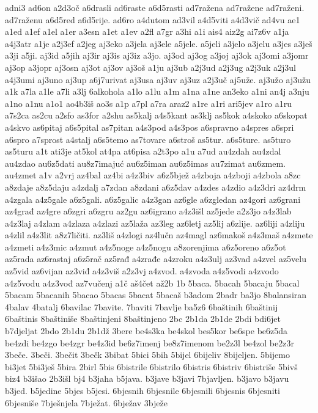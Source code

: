 {adni3
ad6on
a2d3oč
a6drasli
ad6raste
a6d5rasti
ad7ražena
ad7ražene
ad7raženi.
ad7raženu
a6d5red
a6d5rije.
ad6ro
a4dutom
ad3vil
a4d5viti
a4d3vič
ad4vu
ae1
a1ed
a1ef
a1el
a1er
a3esn
a1et
a1ev
a2fl
a7gr
a3hi
a1i
ais4
aiz2g
ai7z6v
a1ja
a4j3atr
a1je
a2j3ef
a2jeg
aj3eko
a3jela
aj3ele
a5jele.
a5jeli
a3jelo
a3jelu
a3jes
a3ješ
a3ji
a5ji.
aj3id
a5jih
aj3ir
aj3is
aj3iz
a3jo.
aj3od
aj3og
a3joj
aj3ok
aj3omi
a3jomr
aj3op
a3jopr
aj3osn
aj3ot
aj3ov
aj3oš
a1ju
aj3ub
a2j3ud
a2j3ug
a2j3uk
a2j3ul
a4j3umi
aj3uno
aj3up
a6j7urivat
aj3usa
aj3uv
aj3uz
a2j3uč
aj5uže.
aj3užo
aj3užu
a1k
a7la
a1le
a7li
a3lj
6alkohola
a1lo
a1lu
a1m
a1na
a1ne
an3eko
a1ni
an4j
a3nju
a1no
a1nu
a1o1
ao4b3iš
ao3s
a1p
a7pl
a7ra
araz2
a1re
a1ri
ari5jev
a1ro
a1ru
a7s2ca
as2cu
a2sfo
as3for
a2shu
as5kalj
a4s5kant
as3klj
as5kok
a4skoko
a6skopat
a4skvo
as6pitaj
a6s5pital
as7pitan
a4s3pod
a4s3pos
a6spravno
a4spres
a6spri
a6spro
a7sprost
a4stalj
a6s5temo
as7tovare
a6stroš
as5tur.
a6s5ture.
as5turo
as5turu
a1t
ati3je
at5kol
at4pa
at6pisa
a2t3po
a1u
a7ud
au4zdah
au4zdal
au4zdao
au6z5dati
au8z7imajuć
au6z5iman
au6z5imas
au7zimat
au6zmem.
au4zmet
a1v
a2vrj
az4bal
az4bi
a4z3biv
a6z5bjež
a4zboja
a4zboji
a4zbola
a8zc
a8zdaje
a8z5daju
a4zdalj
a7zdan
a8zdani
a6z5dav
a4zdes
a4zdio
a4z3dri
az4drm
a4zgala
a4z5gale
a6z5gali.
a6z5galic
a4z3gan
az6gle
a6zgledan
az4gori
az6grani
az4građ
az4gre
a6zgri
a6zgru
az2gu
az6igrano
a4z3išl
az5jede
a2z3jo
a4z3lab
a4z3laj
a4zlam
a4zlaza
a4zlazi
az5laža
az3leg
az6letj
az5lij
a6zlije.
az6liji
a4zliju
a4zlil
a4z3lit
a8z7ličiti.
az3liš
a4zlogi
az4lučn
az4magl
az6makoš
a4z3maš
a4zmete
a4zmeti
a4z3mic
a4zmut
a4z5noge
a4z5nogu
a8zorenjima
a6z5oreno
a6z5ot
az5rada
az6rastaj
a6z5rač
az5rađ
a4zrađe
a4zroku
a4z3ulj
az3vad
a4zvel
az5velu
az5vid
az6vijan
az3viđ
a4z3viš
a2z3vj
a4zvod.
a4zvoda
a4z5vodi
a4zvodo
a4z5vodu
a4z3vođ
az7vučenj
a1č
aš4čet
až2b
1b
5baca.
5bacah
5bacaju
5bacal
5bacam
5bacanih
5bacao
5bacas
5bacat
5bacaš
b3adom
2badr
ba3jo
8balansiran
4balav
4batalj
6bavilac
7bavite.
7baviti
7bavlje
ba5z6
6baštinih
6baštinij
6baštinis
8baštiniše
8baštinjeni
8baštinjeno
2bc
2b1da
2b1de
2bdi
bdi6jet
b7djeljat
2bdo
2b1du
2b1dž
3bere
be4s3ka
be4skol
bes5kor
be6spe
be6z5da
be4zdi
be4zgo
be4zgr
be4z3id
be6z7imenj
be8z7imenom
be2z3l
be4zol
be2z3r
3beče.
3beči.
3bečit
3bečk
3bibat
5bici
5bih
5bijel
6bijeliv
8bijeljen.
5bijemo
bi3jet
5bi3ješ
5bira
2birl
5bis
6bistrile
6bistrilo
6bistris
6bistriv
6bistriše
5bivš
biz4
b3išao
2b3išl
bj4
b3jaha
b5java.
b3jave
b3javi
7bjavljen.
b3javo
b3javu
b3jed.
b5jedine
5bjes
b5jesi.
6bjesnih
6bjesnile
6bjesnili
6bjesnis
6bjesniti
6bjesniše
7bješnjela
7bježat.
6bježav
3bježe
}
